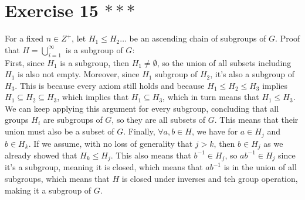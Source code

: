 \documentclass{article}
\begin{document}
    \section*{Exercise 15 $***$}
    For a fixed $n \in Z^+$, let $H_1 \leqslant H_2 \dots$
    be an ascending chain of subgroups of $G$.
    Proof that $H = \bigcup_{i = 1}^{\infty}$ is a subgroup of $G$: \\
    First, since $H_1$ is a subgroup, then $H_1 \neq \emptyset$,
    so the union of all subsets including $H_1$ is also not empty.
    Moreover, since $H_1$ subgroup of $H_2$, it's also a subgroup of $H_3$.
    This is because every axiom still holds
    and because $H_1 \leqslant H_2 \leqslant H_3$ implies
    $H_1 \subseteq H_2 \subseteq H_3$,
    which implies that $H_1 \subseteq H_3$,
    which in turn means that $H_1 \leqslant H_3$.
    We can keep applying this argument for every subgroup,
    concluding that all groups $H_i$ are subgroups of $G$,
    so they are all subsets of $G$.
    This means that their union must also be a subset of $G$.
    Finally, $\forall a, b \in H$,
    we have for $a \in H_j$ and $b \in H_k$.
    If we assume, with no loss of generality that $j > k$,
    then $b \in H_j$ as we already showed that $H_k \leqslant H_j$.
    This also means that $b^{-1} \in H_j$,
    so $ab^{-1} \in H_j$ since it's a subgroup, meaning it is closed,
    which means that $ab^{-1}$ is in the union of all subgroups,
    which means that $H$ is closed under inverses and teh group operation,
    making it a subgroup of $G$. 
\end{document}
